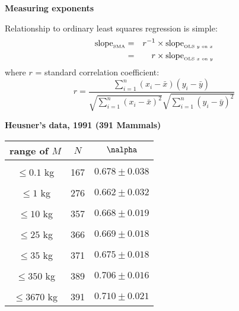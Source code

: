 {  \textbf{Measuring exponents}

Relationship to ordinary least squares regression is simple:
\begin{eqnarray*}
\mbox{slope}_{\mbox{\tiny SMA}} & = & r^{-1} \times 
\mbox{slope}_{\mbox{\tiny OLS $y$ on $x$}} \\ 
& = & r \times \mbox{slope}_{\mbox{\tiny OLS $x$ on $y$}}
\end{eqnarray*}
where $r$ = standard correlation coefficient:
$$
r = \frac{
  \sum_{i=1}^{n} (x_i - \bar{x})(y_i - \bar{y})
}
{
  \sqrt{\sum_{i=1}^{n} (x_i - \bar{x})^2}
  \sqrt{\sum_{i=1}^{n} (y_i - \bar{y})^2}
}
$$






  \textbf{Heusner's data, 1991 (391 Mammals)}

  \begin{center}
     \begin{tabular}{c|c|c}
       range of $M$ & $N$ & $\nalpha$ \\ \hline
       & & \\
       $\leq 0.1$ kg    &  167          & $0.678 \pm 0.038$ \\
       & & \\
       $\leq 1$  kg     &  276          & $0.662 \pm 0.032$ \\
       & & \\
       $\leq 10$ kg     &  357          & $0.668 \pm 0.019$ \\
       & & \\
       $\leq 25$ kg     &  366          & $0.669 \pm 0.018$ \\
       & & \\
       $\leq 35$ kg     &  371          & $0.675 \pm 0.018$ \\
       & & \\
       $\leq 350$ kg    &  389          & $0.706 \pm 0.016$ \\
       & & \\
       $\leq 3670$ kg   &  391          & $0.710 \pm 0.021$ \\
     \end{tabular}
  \end{center}


}
